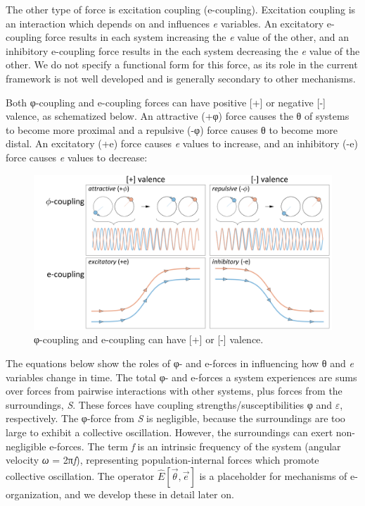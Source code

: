   The other type of force is excitation coupling (e-coupling). Excitation coupling is an interaction which depends on and influences \textit{e} variables. An excitatory e-coupling force results in each system increasing the \textit{e} value of the other, and an inhibitory e-coupling force results in the each system decreasing the \textit{e} value of the other. We do not specify a functional form for this force, as its role in the current framework is not well developed and is generally secondary to other mechanisms.

  Both φ-coupling and e-coupling forces can have positive [+] or negative [-] valence, as schematized below. An attractive (+φ) force causes the θ of systems to become more proximal and a repulsive (-φ) force causes θ to become more distal. An excitatory (+e) force causes \textit{e} values to increase, and an inhibitory (-e) force causes \textit{e} values to decrease: 

  
\begin{figure}
\includegraphics[width=\textwidth]{figures/Tilsen-img20.png}
\caption{φ-coupling and e-coupling can have [+] or [-] valence.}
\label{fig:2:13}
\end{figure}
 

  The equations below show the roles of φ- and e-forces in influencing how θ and \textit{e} variables change in time. The total φ- and e-forces a system experiences are sums over forces from pairwise interactions with other systems, plus forces from the surroundings, \textit{S}. These forces have coupling strengths/susceptibilities φ and $\varepsilon $, respectively. The φ-force from \textit{S} is negligible, because the surroundings are too large to exhibit a collective oscillation. However, the surroundings can exert non-negligible e-forces. The term \textit{f} is an intrinsic frequency of the system (angular velocity \textit{ω} = 2π\textit{f}), representing population-internal forces which promote collective oscillation. The operator  $\widehat {{E}}\left[\overrightarrow{{\theta}} ,\overrightarrow{{e}}\right]$ is a placeholder for mechanisms of e-organization, and we develop these in detail later on.

